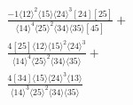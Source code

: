 \documentclass[varwidth, border=5pt]{standalone}
\begin{document}
\begin{my}
$\begin{gathered}
\scriptscriptstyle\frac{-1⟨12⟩^2⟨15⟩⟨24⟩^3[24][25]}{⟨14⟩^4⟨25⟩^2⟨34⟩⟨35⟩[45]}+\\
\scriptscriptstyle\frac{4[25]⟨12⟩⟨15⟩^2⟨24⟩^3}{⟨14⟩^4⟨25⟩^2⟨34⟩⟨35⟩}+\\
\scriptscriptstyle\frac{4[34]⟨15⟩⟨24⟩^3⟨13⟩}{⟨14⟩^3⟨25⟩^2⟨34⟩⟨35⟩}\phantom{+}
\end{gathered}$
\end{my}
\end{document}
